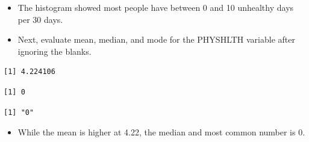 \documentclass[
  letterpaper,
  DIV=11,
  numbers=noendperiod]{scrreprt}
\newenvironment{Shaded}{\begin{snugshade}}{\end{snugshade}}
\newcommand{\AttributeTok}[1]{\textcolor[rgb]{0.40,0.45,0.13}{#1}}
\newcommand{\ConstantTok}[1]{\textcolor[rgb]{0.56,0.35,0.01}{#1}}
\newcommand{\DecValTok}[1]{\textcolor[rgb]{0.68,0.00,0.00}{#1}}
\newcommand{\DocumentationTok}[1]{\textcolor[rgb]{0.37,0.37,0.37}{\textit{#1}}}
\newcommand{\FunctionTok}[1]{\textcolor[rgb]{0.28,0.35,0.67}{#1}}
\newcommand{\NormalTok}[1]{\textcolor[rgb]{0.00,0.23,0.31}{#1}}
\newcommand{\SpecialCharTok}[1]{\textcolor[rgb]{0.37,0.37,0.37}{#1}}
\providecommand{\tightlist}{%
  \setlength{\itemsep}{0pt}\setlength{\parskip}{0pt}}\usepackage{longtable,booktabs,array}
\begin{document}
\begin{itemize}
\item
  The histogram showed most people have between 0 and 10 unhealthy days
  per 30 days.
\item
  Next, evaluate mean, median, and mode for the PHYSHLTH variable after
  ignoring the blanks.
\end{itemize}

\begin{Shaded}
\end{Shaded}

\begin{verbatim}
[1] 4.224106
\end{verbatim}

\begin{Shaded}
\end{Shaded}

\begin{verbatim}
[1] 0
\end{verbatim}

\begin{Shaded}
\end{Shaded}

\begin{verbatim}
[1] "0"
\end{verbatim}

\begin{itemize}
\tightlist
\item
  While the mean is higher at 4.22, the median and most common number is
  0.
\end{itemize}

\begin{Shaded}
\end{Shaded}
\end{document}
